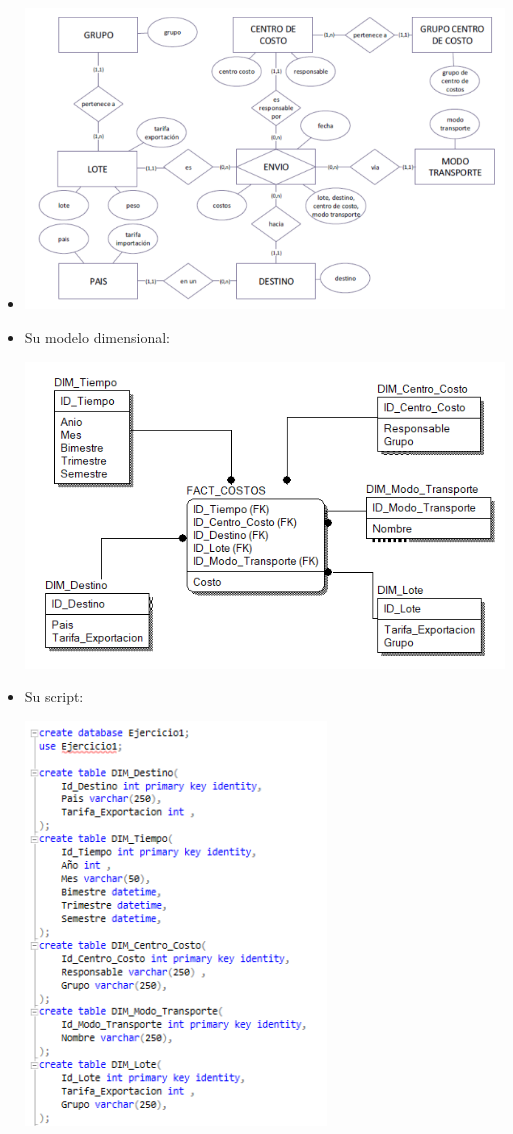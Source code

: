 \documentclass[12pt,letterpaper]{article}
\begin{document}
\begin{itemize}
\item  
	\begin{center}
	\includegraphics[width=14cm]{./Imagenes/e1}
	\end{center}
	\item Su modelo dimensional:
	\begin{center}
	\includegraphics[width=14cm]{./Imagenes/d1}
	\end{center}
\item Su script:
	\begin{center}
	\includegraphics[width=8cm]{./Imagenes/s1-1}

\end{center}
\end{itemize}
\end{document}
